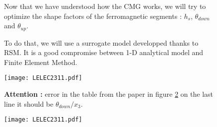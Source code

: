 \begin{figure}[H]
    \begin{minipage}{.45\linewidth}
    Now that we have understood how the CMG works, we will try to optimize the shape factors of the ferromagnetic segments : $h_s$, $\theta_{down}$ and $\theta_{up}$.
    
    To do that, we will use a surrogate model developped thanks to RSM. It is a good compromise between 1-D analytical model and Finite Element Method.
    \end{minipage}
    \hfill%
    \begin{minipage}[c]{.53\linewidth}
        \centering
        \texttt{[image: LELEC2311.pdf]}
        \label{fig:56_th slide}
        \caption{}
    \end{minipage}
\end{figure}

\begin{figure}[H]
    \begin{minipage}{.45\linewidth}
    \textbf{Attention :} error in the table from the paper in figure \ref{fig:57_th slide}
    on the last line it should be $\theta_{down}/x_3$.
    \end{minipage}
    \hfill%
    \begin{minipage}[c]{.53\linewidth}
        \centering
        \texttt{[image: LELEC2311.pdf]}
        \caption{}
        \label{fig:57_th slide}
    \end{minipage}
\end{figure}

